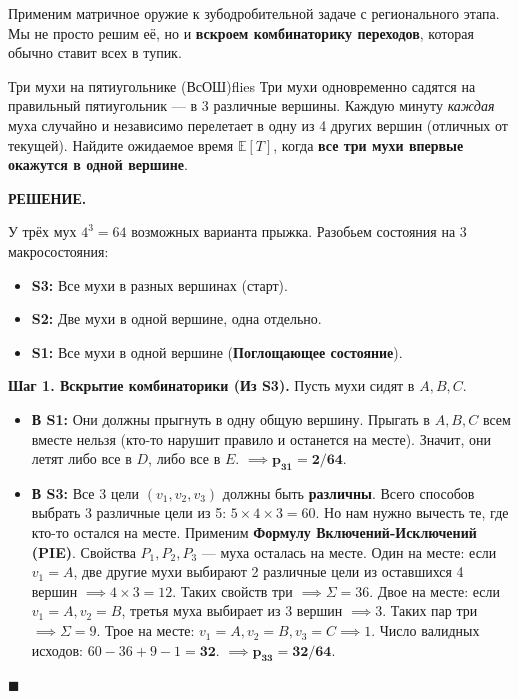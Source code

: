 \documentclass[12pt,a4paper]{article}
\newcommand{\E}{\mathbb{E}}
\newenvironment{solution}{
    \begin{tcolorbox}[
        enhanced, breakable, blanker,
        borderline west={2.5pt}{0pt}{solgray},
        left=12pt, top=5pt, bottom=5pt,
        before skip=10pt, after skip=15pt
    ]
    \textbf{\textsf{РЕШЕНИЕ.}}\;
}{
    \hfill $\blacksquare$
    \end{tcolorbox}
}
\begin{document}
Применим матричное оружие к зубодробительной задаче с регионального этапа. Мы не просто решим её, но и \textbf{вскроем комбинаторику переходов}, которая обычно ставит всех в тупик.

\begin{problem}{Три мухи на пятиугольнике (ВсОШ)}{flies}
Три мухи одновременно садятся на правильный пятиугольник — в 3 различные вершины. Каждую минуту \textit{каждая} муха случайно и независимо перелетает в одну из 4 других вершин (отличных от текущей). 
Найдите ожидаемое время $\E[T]$, когда \textbf{все три мухи впервые окажутся в одной вершине}.
\end{problem}

\begin{solution}
У трёх мух $4^3 = 64$ возможных варианта прыжка. Разобьем состояния на 3 макросостояния:
\begin{itemize}
    \item \textbf{S3:} Все мухи в разных вершинах (старт).
    \item \textbf{S2:} Две мухи в одной вершине, одна отдельно.
    \item \textbf{S1:} Все мухи в одной вершине (\textbf{Поглощающее состояние}).
\end{itemize}

\textbf{Шаг 1. Вскрытие комбинаторики (Из S3).} Пусть мухи сидят в $A, B, C$.
\begin{itemize}
    \item \textbf{В S1:} Они должны прыгнуть в одну общую вершину. Прыгать в $A, B, C$ всем вместе нельзя (кто-то нарушит правило и останется на месте). Значит, они летят либо все в $D$, либо все в $E$. $\implies \mathbf{p_{31} = 2/64}$.
    
    \item \textbf{В S3:} Все 3 цели $(v_1, v_2, v_3)$ должны быть \textbf{различны}. Всего способов выбрать 3 различные цели из 5: $5 \times 4 \times 3 = 60$. Но нам нужно вычесть те, где кто-то остался на месте.
    Применим \textbf{Формулу Включений-Исключений (PIE)}. Свойства $P_1, P_2, P_3$ — муха осталась на месте. 
    Один на месте: если $v_1=A$, две другие мухи выбирают 2 различные цели из оставшихся 4 вершин $\implies 4 \times 3 = 12$. Таких свойств три $\implies \Sigma = 36$.
    Двое на месте: если $v_1=A, v_2=B$, третья муха выбирает из 3 вершин $\implies 3$. Таких пар три $\implies \Sigma = 9$.
    Трое на месте: $v_1=A, v_2=B, v_3=C \implies 1$.
    Число валидных исходов: $60 - 36 + 9 - 1 = \mathbf{32}$. $\implies \mathbf{p_{33} = 32/64}$.
    

\end{itemize}
\end{solution}
\end{document}
